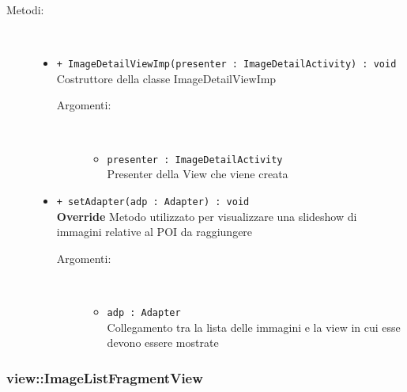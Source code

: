 \documentclass[../DefinizioneDiProdotto.tex]{subfiles}
\begin{document}
\begin{description}
\begin{itemize}
\end{itemize}
\item[Metodi:] \
\begin{itemize}
\item \texttt{+ ImageDetailViewImp(presenter : ImageDetailActivity) : void}\\
Costruttore della classe ImageDetailViewImp
 \begin{description}
\item[Argomenti:] \
\begin{itemize}
\item \texttt{presenter : ImageDetailActivity}\\
Presenter della View che viene creata\end{itemize}
\end{description}
\item \texttt{+ setAdapter(adp : Adapter) : void}\\
\textbf{Override} Metodo utilizzato per visualizzare una slideshow di immagini relative al POI da raggiungere
 \begin{description}
\item[Argomenti:] \
\begin{itemize}
\item \texttt{adp : Adapter}\\
Collegamento tra la lista delle immagini e la view in cui esse devono essere mostrate\end{itemize}
\end{description}
\end{itemize}
\end{description}

\subsubsection{view::ImageListFragmentView}
\end{document}
